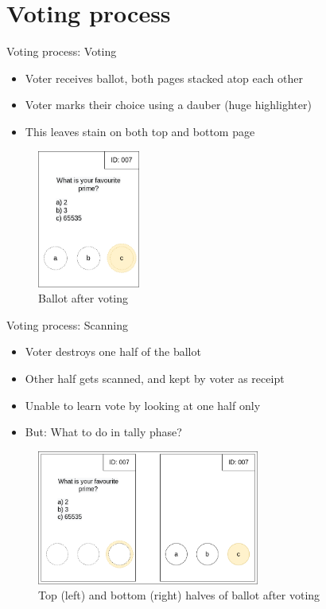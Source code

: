 \documentclass{beamer}
\begin{document}
\section{Voting process}

\begin{frame}{Voting process: Voting}
	\begin{itemize}
		\item Voter receives ballot, both pages stacked atop each other
		\item Voter marks their choice using a dauber (huge highlighter)
		\item This leaves stain on both top and bottom page
	\end{itemize}
	\begin{figure}
		\centering
		\includegraphics[width=0.3\textwidth]{../resources/high_level_ballot_voted.drawio.png}
		\caption{Ballot after voting}
	\end{figure}
\end{frame}

\begin{frame}{Voting process: Scanning}
	\begin{itemize}
		\item Voter destroys one half of the ballot
		\item Other half gets scanned, and kept by voter as receipt
		\item Unable to learn vote by looking at one half only
		\item But: What to do in tally phase?
	\end{itemize}
	\begin{figure}
		\centering
		\includegraphics[width=0.65\textwidth]{../resources/high_level_ballot_voted_split.drawio.png}
		\caption{Top (left) and bottom (right) halves of ballot after voting}
	\end{figure}
\end{frame}
\end{document}
